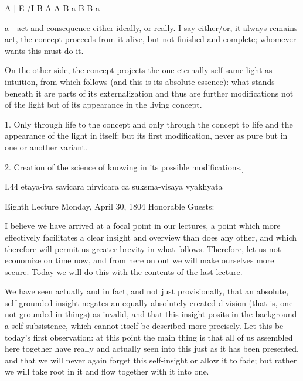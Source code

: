 A | E /I B-A A-B \R a-B B-a

a—act and consequence either ideally, or really.
I say either/or, it always remains act,
the concept proceeds from it alive,
but not finished and complete;
whomever wants this must do it.

On the other side, the concept projects
the one eternally self-same light as intuition,
from which follows (and this is its absolute essence):
what stands beneath it are parts of its externalization
and thus are further modifications not of the light
but of its appearance in the living concept.

1. Only through life to the concept
and only through the concept to life
and the appearance of the light in itself:
but its first modification, never as pure
but in one or another variant.

2. Creation of the science of knowing
in its possible modifications.]

I.44
etaya-iva savicara nirvicara ca suksma-visaya vyakhyata

Eighth Lecture
Monday, April 30, 1804
Honorable Guests:

I believe we have arrived at a focal point in our lectures,
a point which more effectively facilitates
a clear insight and overview than does any other,
and which therefore will permit us greater brevity in what follows.
Therefore, let us not economize on time now,
and from here on out we will make ourselves more secure.
Today we will do this with the contents of the last lecture.

We have seen actually and in fact,
and not just provisionally,
that an absolute, self-grounded insight negates
an equally absolutely created division
(that is, one not grounded in things)
as invalid, and that this insight posits
in the background a self-subsistence,
which cannot itself be described more precisely.
Let this be today's first observation:
at this point the main thing is that
all of us assembled here together have
really and actually seen into this
just as it has been presented,
and that we will never again forget this
self-insight or allow it to fade;
but rather we will take root in it
and flow together with it into one.

